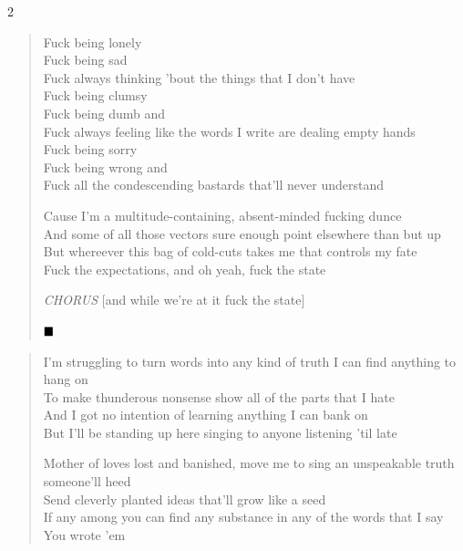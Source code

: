 \documentclass[11pt]{book}
\begin{document}
\begin{multicols}{2}
\begin{verse}
Fuck being lonely \\
Fuck being sad \\
Fuck always thinking 'bout the things that I don't have \\
Fuck being clumsy \\
Fuck being dumb and \\
Fuck always feeling like the words I write are dealing empty hands \\
Fuck being sorry \\
Fuck being wrong and \\
Fuck all the condescending bastards that'll never understand

\hspace{2em} Cause I'm a multitude-containing, absent-minded fucking dunce \\
\hspace{2em} And some of all those vectors sure enough point elsewhere than but up \\
\hspace{2em} But whereever this bag of cold-cuts takes me that controls my fate \\
\hspace{2em} Fuck the expectations, and oh yeah, fuck the state

\hspace{2em} \emph{CHORUS} [and while we're at it fuck the state]

$\hfill\blacksquare$
\end{verse}

\begin{verse}

\tiny
I'm struggling to turn words into any kind of truth I can find anything to hang on \\
To make thunderous nonsense show all of the parts that I hate \\
And I got no intention of learning anything I can bank on \\
But I'll be standing up here singing to anyone listening 'til late

Mother of loves lost and banished, move me to sing an unspeakable truth someone'll heed \\
Send cleverly planted ideas that'll grow like a seed \\
If any among you can find any substance in any of the words that I say \\
You wrote 'em


\end{verse}
\end{multicols}
\end{document}
